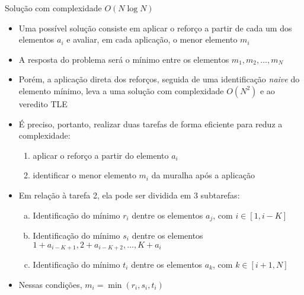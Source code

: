 \begin{frame}[fragile]{Solução com complexidade $O(N\log N)$}

    \begin{itemize}
        \item Uma possível solução consiste em aplicar o reforço a partir de cada um dos elementos
            $a_i$ e avaliar, em cada aplicação, o menor elemento $m_i$

        \item A resposta do problema será o mínimo entre os elementos $m_1, m_2, \ldots, m_N$

        \item Porém, a aplicação direta dos reforços, seguida de uma identificação \textit{naive} do
            elemento mínimo, leva a uma solução com complexidade $O(N^2)$ e ao veredito TLE

        \item É preciso, portanto, realizar duas tarefas de forma eficiente para reduz a
            complexidade:

            \begin{enumerate}
                \item aplicar o reforço a partir do elemento $a_i$
                \item identificar o menor elemento $m_i$ da muralha após a aplicação
            \end{enumerate}

        \item Em relação à tarefa 2, ela pode ser dividida em 3 subtarefas:
            \begin{enumerate}[(a)]
                \item Identificação do mínimo $r_i$ dentre os elementos $a_j$, com $i\in [1, i - K]$
                \item Identificação do mínimo $s_i$ dentre os elementos
                    $
                        1 + a_{i - K + 1}, 2 + a_{i - K + 2}, \ldots, K + a_{i}
                    $
                \item Identificação do mínimo $t_i$ dentre os elementos $a_k$, com $k\in [i + 1, N]$
            \end{enumerate}

        \item Nessas condições, $m_i = \min(r_i, s_i, t_i)$
   \end{itemize}

\end{frame}

